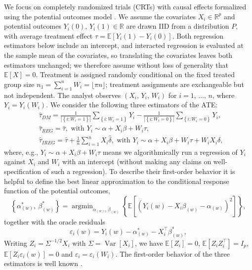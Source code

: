 \documentclass{article}
\newcommand{\RR}{\mathbb{R}}
\newcommand{\EEE}{\mathbb{E}}
\newcommand{\EE}[1]{\mathbb{E}\left[#1\right]}
\newcommand{\Var}[1]{\operatorname{Var}\left[#1\right]}
\newcommand{\p}[1]{\left(#1\right)}
\newcommand{\cb}[1]{\left\{#1\right\}}
\newcommand{\abs}[1]{\left|#1\right|}
\newcommand{\htau}{\hat{\tau}}
\newcommand{\hdelta}{\hat{\delta}}
\DeclareMathOperator*{\argmin}{argmin}
\theoremstyle{plain}
\theoremstyle{definition}
\theoremstyle{remark}
\begin{document}
We focus on completely randomized trials (CRTs) with causal effects formalized using the potential outcomes model \citep{imbens2015causal}. We assume the covariates $X_i\in \RR^p$ and potential outcomes $Y_i(0), \, Y_i(1) \in \RR$ are drawn IID from a distribution $P$, with average treatment effect $\tau = \EE{Y_i(1) - Y_i(0)}$. Both regression estimators below include an intercept, and interacted regression is evaluated at the sample mean of the covariates, so translating the covariates leaves both estimators unchanged; we therefore assume without loss of generality that $\EE{X}=0$. Treatment is assigned randomly conditional on the fixed treated group size $n_1=\sum_{i=1}^n W_i=\lfloor \pi n\rfloor$; treatment assignments are exchangeable but not independent.  The analyst observes $(X_i, \, Y_i, \, W_i)$ for $i = 1, \, \ldots, \, n$, where $Y_i = Y_i(W_i)$. We consider the following three estimators of the ATE:
\begin{equation}
\label{eq:estimators}
\begin{split}
&\htau_{DM} = \frac{1}{\abs{\cb{i : W_i = 1}}} \sum_{\cb{i : W_i = 1}} Y_i - \frac{1}{\abs{\cb{i : W_i = 0}}} \sum_{\cb{i : W_i = 0}} Y_i, \\
&\htau_{REG} = \htau,  \text{ with }  Y_i \sim \alpha + X_i \beta + W_i \tau, \\
&\htau_{IREG} = \htau + \frac{1}{n} \sum_{i = 1}^n X_i \hdelta,  \text{ with } Y_i \sim \alpha + X_i \beta + W_i \tau+  W_i X_i \delta,
\end{split}
\end{equation}
where, e.g., $Y_i \sim \alpha + X_i \beta + W_i \tau$ means we algorithmically run a regression of $Y_i$ against $X_i$ and $W_i$ with an intercept (without making any claims on well-specification of such a regression). To describe their first-order behavior it is helpful to define the best linear approximation to the conditional response function of the potential outcomes,
\begin{equation}
\label{eq:regr}
\cb{\alpha_{(w)}^*, \ \beta_{(w)}^*} =\argmin_{\alpha_{(w)},\,\beta_{(w)}} \cb{\EE{\p{Y_i(w) - X_i \beta_{(w)} - \alpha_{(w)}}^2}},
\end{equation}
together with the oracle residuals
\begin{equation}
\label{eq:epsi}
\varepsilon_i(w) = Y_i(w)-\alpha^*_{(w)}-X_i^\top\beta^*_{(w)},
\end{equation}
Writing $Z_i=\Sigma^{-1/2}X_i$ with $\Sigma=\Var{X_i}$, we have $\EEE[Z_i]=0$, $\EEE[Z_iZ_i^\top]=I_p$, $\EEE[Z_i\varepsilon_i(w)]=0$ and $\varepsilon_i = \varepsilon_i(W_i)$. The first-order behavior of the three estimators is well known \citep{negi2021revisiting}.
\end{document}
